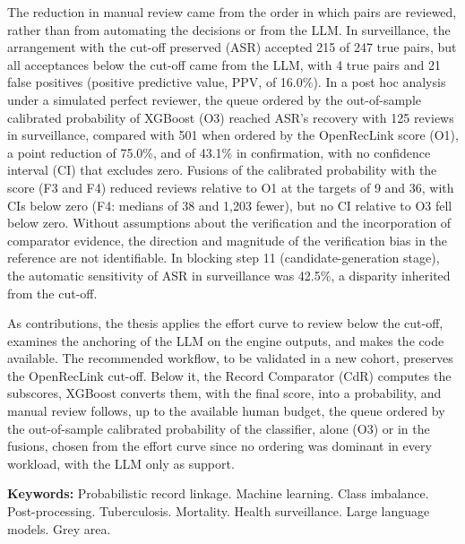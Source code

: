 \documentclass[12pt,a4paper,openany]{book}
\begin{document}
The reduction in manual review came from the order in which pairs are reviewed, rather than from automating the decisions or from the LLM. In surveillance, the arrangement with the cut-off preserved (ASR) accepted 215 of 247 true pairs, but all acceptances below the cut-off came from the LLM, with 4 true pairs and 21 false positives (positive predictive value, PPV, of 16.0\%). In a post hoc analysis under a simulated perfect reviewer, the queue ordered by the out-of-sample calibrated probability of XGBoost (O3) reached ASR's recovery with 125 reviews in surveillance, compared with 501 when ordered by the OpenRecLink score (O1), a point reduction of 75.0\%, and of 43.1\% in confirmation, with no confidence interval (CI) that excludes zero. Fusions of the calibrated probability with the score (F3 and F4) reduced reviews relative to O1 at the targets of 9 and 36, with CIs below zero (F4: medians of 38 and 1,203 fewer), but no CI relative to O3 fell below zero. Without assumptions about the verification and the incorporation of comparator evidence, the direction and magnitude of the verification bias in the reference are not identifiable. In blocking step 11 (candidate-generation stage), the automatic sensitivity of ASR in surveillance was 42.5\%, a disparity inherited from the cut-off.

As contributions, the thesis applies the effort curve to review below the cut-off, examines the anchoring of the LLM on the engine outputs, and makes the code available. The recommended workflow, to be validated in a new cohort, preserves the OpenRecLink cut-off. Below it, the Record Comparator (CdR) computes the subscores, XGBoost converts them, with the final score, into a probability, and manual review follows, up to the available human budget, the queue ordered by the out-of-sample calibrated probability of the classifier, alone (O3) or in the fusions, chosen from the effort curve since no ordering was dominant in every workload, with the LLM only as support.

\vspace{15pt}

\textbf{Keywords:} Probabilistic record linkage. Machine learning. Class imbalance. Post-processing. Tuberculosis. Mortality. Health surveillance. Large language models. Grey area.




\end{document}
